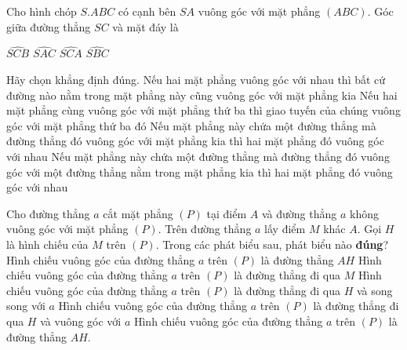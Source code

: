 \begin{ex} %
Cho hình chóp $S.ABC$ có cạnh bên $SA$ vuông góc với mặt phẳng $(ABC)$. Góc giữa đường thẳng $SC$ và mặt đáy là




\choice
{$\widehat{SCB}$}
{$\widehat{SAC}$}
{\True$\widehat{SCA}$}
{$\widehat{SBC}$}
\end{ex}

\begin{ex}%
Hãy chọn khẳng định đúng.
\choice
{Nếu hai mặt phẳng vuông góc với nhau thì bất cứ đường nào nằm trong mặt phẳng này cũng vuông góc với mặt phẳng kia}
{Nếu hai mặt phẳng cùng vuông góc với mặt phẳng thứ ba thì giao tuyến của chúng vuông góc với mặt phẳng thứ ba đó}
{\True Nếu mặt phẳng này chứa một đường thẳng mà đường thẳng đó vuông góc với mặt phẳng kia thì hai mặt phẳng đó vuông góc với nhau}
{Nếu mặt phẳng này chứa một đường thẳng mà đường thẳng đó vuông góc với một đường thẳng nằm trong mặt phẳng kia thì hai mặt phẳng đó vuông góc với nhau}
\end{ex}

\begin{ex}%
Cho đường thẳng $a$ cắt mặt phẳng $(P)$ tại điểm $A$ và đường thẳng $a$ không vuông góc với mặt phẳng $(P)$. Trên đường thẳng $a$ lấy điểm $M$ khác $A$. Gọi $H$ là hình chiếu của $M$ trên $(P)$. Trong các phát biểu sau, phát biểu nào \textbf{đúng}?
\choice
{\True Hình chiếu vuông góc của đường thẳng $a$ trên $(P)$ là đường thẳng $AH$}
{Hình chiếu vuông góc của đường thẳng $a$ trên $(P)$ là đường thẳng đi qua $M$}
{Hình chiếu vuông góc của đường thẳng $a$ trên $(P)$ là đường thẳng đi qua $H$ và song song với $a$}
{Hình chiếu vuông góc của đường thẳng $a$ trên $(P)$ là đường thẳng đi qua $H$ và vuông góc với $a$}
\loigiai
{Hình chiếu vuông góc của đường thẳng $a$ trên $(P)$ là đường thẳng $AH$.
}
\end{ex}

